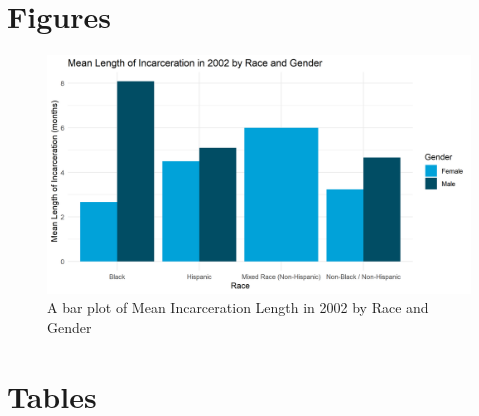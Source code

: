 \documentclass{article}
\begin{document}
\section{Figures}

\begin{figure}[H]
\begin{center}
\includegraphics[width=.85\textwidth]{incar_length_by_racegender}
\end{center}
\caption{A bar plot of Mean Incarceration Length in 2002 by Race and Gender}
\label{fig:graph}
\end{figure}

\section{Tables}






\end{document}
